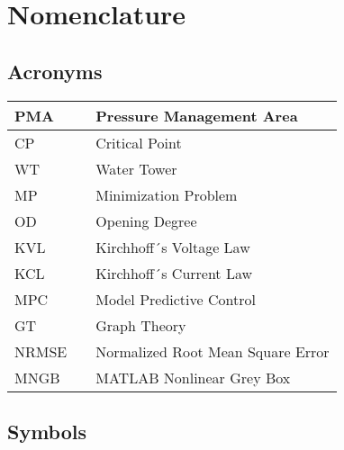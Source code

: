 \chapter{Nomenclature}

\section*{Acronyms}
	
	\begin{tabular}{|l c l|} \hline
		PMA 		&&	Pressure Management Area		\\ \hline
		CP			&&	Critical Point					\\ \hline
		WT			&&	Water Tower						\\ \hline
		MP		  	&&	Minimization Problem			\\ \hline
		OD 			&&  Opening Degree					\\ \hline
		KVL 		&&  Kirchhoff´s Voltage Law 		\\ \hline
		KCL 		&&  Kirchhoff´s Current Law			\\ \hline
		MPC			&&  Model Predictive Control		\\ \hline
		GT			&&  Graph Theory					\\ \hline
		NRMSE	    &&  Normalized Root Mean Square Error	\\ \hline
		MNGB		&&  MATLAB Nonlinear Grey Box	\\ \hline
	\end{tabular}
\section*{Symbols}

